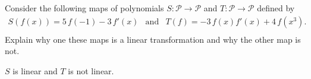 
\begin{exerciseStatement}


Consider the following maps of polynomials \(S:\mathcal{P}\rightarrow\mathcal{P}\) and \(T:\mathcal{P}\rightarrow\mathcal{P}\) defined by 
\begin{align*} S(f(x))= 5 \, f\left(-1\right) - 3 \, f'\left(x\right)  & \text{and} & T(f)= -3 \, f\left(x\right) f'\left(x\right) + 4 \, f\left(x^{3}\right) . \\ \end{align*}
             Explain why one these maps is a linear transformation and why the other map is not. 


\end{exerciseStatement}
    
\begin{exerciseAnswer} 


\(S\) is linear and \(T\) is not linear.


\end{exerciseAnswer}
    
